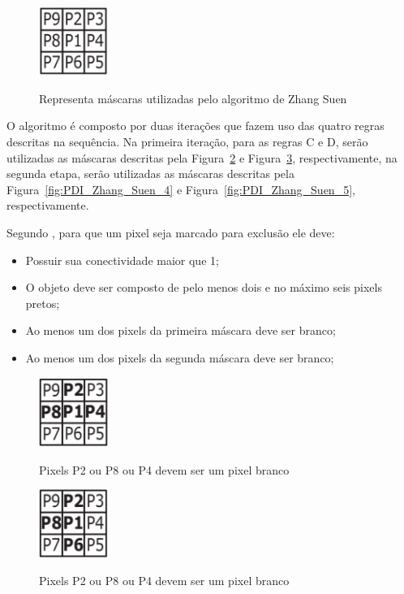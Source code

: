 \documentclass[12pt,oneside,a4paper,english,french,spanish,brazil,]{abntex2}
\begin{document}
\begin{figure}[ht]
\centering
\caption{Representa máscaras utilizadas pelo algoritmo de Zhang Suen}
\includegraphics[width=0.2\textwidth]{imagens/PDI_Zhang_Suen_1.PNG}
\label{fig:PDI_Zhang_Suen_1}
\end{figure}

O algoritmo é composto por duas iterações que fazem uso das quatro regras descritas na sequência. Na primeira iteração, para as regras C e D, serão utilizadas as máscaras descritas pela Figura~\ref{fig:PDI_Zhang_Suen_2} e Figura~\ref{fig:PDI_Zhang_Suen_3}, respectivamente, na segunda etapa, serão utilizadas as máscaras descritas pela Figura~\ref{fig:PDI_Zhang_Suen_4} e Figura~\ref{fig:PDI_Zhang_Suen_5}, respectivamente.

Segundo \citet{guilherme:2007}, para que um pixel seja marcado para exclusão ele deve:
\begin{itemize}
\item Possuir sua conectividade maior que 1;
\item O objeto deve ser composto de pelo menos dois e no máximo seis pixels pretos;
\item Ao menos um dos pixels da primeira máscara deve ser branco;
\item Ao menos um dos pixels da segunda máscara deve ser branco;
\end{itemize}

\begin{figure}[ht]
\centering
\caption{Pixels P2 ou P8 ou P4 devem ser um pixel branco}
\includegraphics[width=0.2\textwidth]{imagens/PDI_Zhang_Suen_2.PNG}
\label{fig:PDI_Zhang_Suen_2}
\end{figure}

\begin{figure}[ht]
\centering
\caption{Pixels P2 ou P8 ou P4 devem ser um pixel branco}
\includegraphics[width=0.2\textwidth]{imagens/PDI_Zhang_Suen_3.PNG}
\label{fig:PDI_Zhang_Suen_3}
\end{figure}
\end{document}
